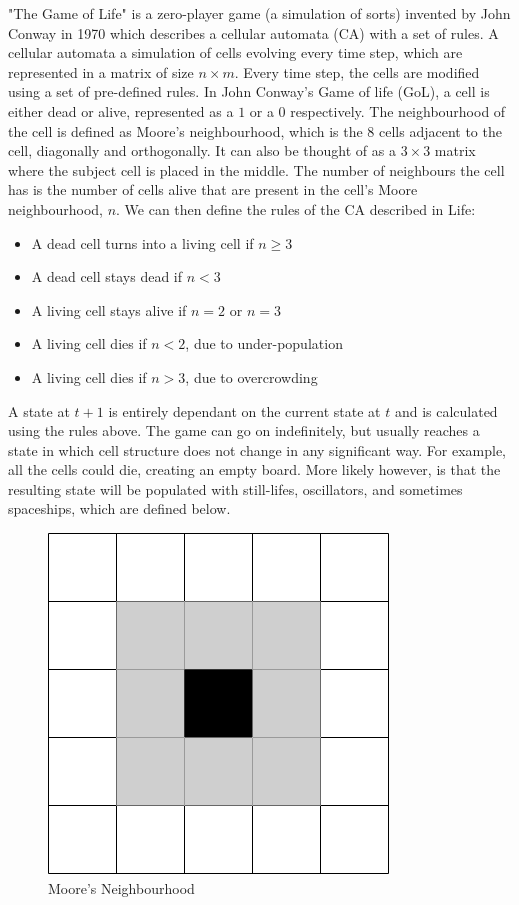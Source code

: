 \documentclass{l4proj}
\begin{document}
"The Game of Life" is a zero-player game (a simulation of sorts) invented by John Conway in 1970 which describes a cellular automata (CA) with a set of rules. A cellular automata a simulation of cells evolving every time step, which are represented in a matrix of size $n\times m$. Every time step, the cells are modified using a set of pre-defined rules. In John Conway's Game of life (GoL), a cell is either dead or alive, represented as a $1$ or a $0$ respectively. The neighbourhood of the cell is defined as Moore's neighbourhood, which is the 8 cells adjacent to the cell, diagonally and orthogonally. It can also be thought of as a $3\times 3$ matrix where the subject cell is placed in the middle. The number of neighbours the cell has is the number of cells alive that are present in the cell's Moore neighbourhood, $n$. We can then define the rules of the CA described in Life:

\begin{itemize}
    \item A dead cell turns into a living cell if $n \geq 3$
    \item A dead cell stays dead if $n < 3$
    \item A living cell stays alive if $n = 2$ or $n = 3$
    \item A living cell dies if $n < 2$, due to under-population
    \item A living cell dies if $n > 3$, due to overcrowding
\end{itemize}

A state at $t+1$ is entirely dependant on the current state at $t$ and is calculated using the rules above. The game can go on indefinitely, but usually reaches a state in which cell structure does not change in any significant way. For example, all the cells could die, creating an empty board. More likely however, is that the resulting state will be populated with still-lifes, oscillators, and sometimes spaceships, which are defined below.

\begin{figure}[h]
\centering
\includegraphics[width=0.4\linewidth]{dissertation/images/diagrams/moores_neighbourhood.png}
\caption{Moore's Neighbourhood}
\label{fig:subim1}

\end{figure}
\end{document}
